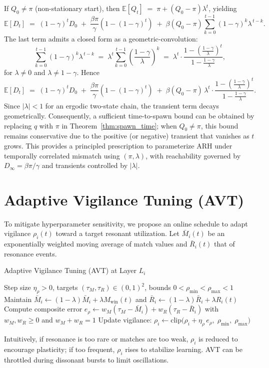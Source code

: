 \documentclass{article}
\numberwithin{figure}{section}
\numberwithin{table}{section}
\numberwithin{algorithm}{section}
\begin{document}
If $Q_0 \neq \pi$ (non-stationary start), then $\mathbb{E}[Q_t] \;=\; \pi + (Q_0-\pi)\lambda^t$, yielding
\[
\mathbb{E}[D_t] \;=\; (1-\gamma)^t D_0 \;+\; \frac{\beta \pi}{\gamma}\!\left(1-(1-\gamma)^t\right)
\;+\; \beta(Q_0-\pi)\sum_{k=0}^{t-1} (1-\gamma)^k \lambda^{\,t-k}.
\]
The last term admits a closed form as a geometric-convolution:
\[
\sum_{k=0}^{t-1} (1-\gamma)^k \lambda^{\,t-k}
\;=\; \lambda^t \sum_{k=0}^{t-1}\!\left(\frac{1-\gamma}{\lambda}\right)^{\!k}
\;=\; \lambda^t \cdot \frac{1 - \left(\frac{1-\gamma}{\lambda}\right)^t}{1 - \frac{1-\gamma}{\lambda}},
\]
for $\lambda \neq 0$ and $\lambda \neq 1-\gamma$. Hence
\[
\mathbb{E}[D_t] \;=\; (1-\gamma)^t D_0 \;+\; \frac{\beta \pi}{\gamma}\!\left(1-(1-\gamma)^t\right)
\;+\; \beta(Q_0-\pi)\,\lambda^t \cdot \frac{1 - \left(\frac{1-\gamma}{\lambda}\right)^t}{1 - \frac{1-\gamma}{\lambda}}.
\]
Since $|\lambda|<1$ for an ergodic two-state chain, the transient term decays geometrically. Consequently, a sufficient time-to-spawn bound can be obtained by replacing $q$ with $\pi$ in Theorem~\ref{thm:spawn_time}; when $Q_0\neq \pi$, this bound remains conservative due to the positive (or negative) transient that vanishes as $t$ grows. This provides a principled prescription to parameterize ARH under temporally correlated mismatch using $(\pi,\lambda)$, with reachability governed by $D_\infty=\beta \pi/\gamma$ and transients controlled by $|\lambda|$.

\section{Adaptive Vigilance Tuning (AVT)}
To mitigate hyperparameter sensitivity, we propose an online schedule to adapt vigilance $\rho_i(t)$ toward a target resonant utilization. Let $\bar{M}_i(t)$ be an exponentially weighted moving average of match values and $\bar{R}_i(t)$ that of resonance events.
\begin{algorithm}[h]
\caption{Adaptive Vigilance Tuning (AVT) at Layer $L_i$}
\label{alg:avt}
\begin{algorithmic}[1]
\Require Step size $\eta_\rho>0$, targets $(\tau_M,\tau_R) \in (0,1)^2$, bounds $0<\rho_{\min}<\rho_{\max}<1$
\State Maintain $\bar{M}_i \leftarrow (1-\lambda)\bar{M}_i + \lambda M_{\text{win}}(t)$ and $\bar{R}_i \leftarrow (1-\lambda)\bar{R}_i + \lambda R_i(t)$
\State Compute composite error $e_\rho \leftarrow w_M(\tau_M - \bar{M}_i) + w_R(\tau_R - \bar{R}_i)$ with $w_M,w_R\ge 0$ and $w_M+w_R=1$
\State Update vigilance: $\rho_i \leftarrow \mathrm{clip}\big(\rho_i + \eta_\rho\, e_\rho,\; \rho_{\min},\; \rho_{\max}\big)$
\end{algorithmic}
\end{algorithm}
Intuitively, if resonance is too rare or matches are too weak, $\rho_i$ is reduced to encourage plasticity; if too frequent, $\rho_i$ rises to stabilize learning. AVT can be throttled during dissonant bursts to limit oscillations.
\end{document}

